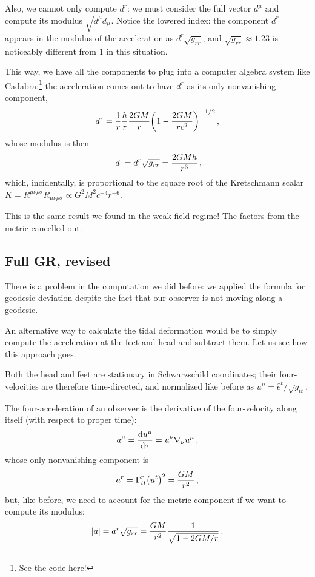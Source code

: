 \documentclass[main.tex]{subfiles}
\begin{document}
Also, we cannot only compute \(d^{r}\): we must consider the full vector \(d^{\mu }\) and compute its modulus \(\sqrt{d^{\mu } d_\mu }\). 
Notice the lowered index: the component \(d^{r}\) appears in the modulus of the acceleration as \(d^{r} \sqrt{g_{rr}}\), and \(\sqrt{g_{rr}} \approx \num{1.23}\) is noticeably different from 1 in this situation. 

This way, we have all the components to plug into a computer algebra system like Cadabra:\footnote{See the code \href{https://jacopok.github.io/schwarzschild.html}{here}!}
the acceleration comes out to have \(d^{r}\) as its only nonvanishing component, 
%
\begin{align}
d^{r} = \frac{1}{r} \frac{h}{r} \frac{2GM}{r} \qty(1 - \frac{2GM}{rc^2})^{-1/2}
\,,
\end{align}
%
whose modulus is then 
%
\begin{align}
\abs{d} = d^{r} \sqrt{g_{rr}} = \frac{2GMh}{r^3} 
\,,
\end{align}
%
which, incidentally, is proportional to the square root of the Kretschmann scalar \(K = R^{\mu \nu \rho \sigma } R_{\mu \nu \rho \sigma } \propto G^2M^2c^{-4} r^{-6}\). 

This is the same result we found in the weak field regime! 
The factors from the metric cancelled out.

\subsection{Full GR, revised}

There is a problem in the computation we did before: we applied the formula for geodesic deviation despite the fact that our observer is not moving along a geodesic. 

An alternative way to calculate the tidal deformation would be to simply compute the acceleration at the feet and head and subtract them. 
Let us see how this approach goes. 

Both the head and feet are stationary in Schwarzschild coordinates; their four-velocities are therefore time-directed, and normalized like before as \(u^{\mu } = \hat{e}^{t} / \sqrt{g_{tt}}\).

The four-acceleration of an observer is the derivative of the four-velocity along itself (with respect to proper time): 
%
\begin{align}
a^{\mu } = \dv{u^{\mu }}{\tau } = u^{\nu } \nabla_{\nu } u^{\mu } 
\,,
\end{align}
%
whose only nonvanishing component is 
%
\begin{align}
a^{r} = \Gamma^{r}_{tt} \qty( u^{t})^2 = \frac{GM}{r^2}
\,,
\end{align}
%
but, like before, we need to account for the metric component if we want to compute its modulus: 
%
\begin{align}
\abs{a} = a^{r} \sqrt{ g_{rr}} = \frac{GM}{r^2} \frac{1}{\sqrt{1 - 2GM / r}}
\,.
\end{align}
\end{document}
